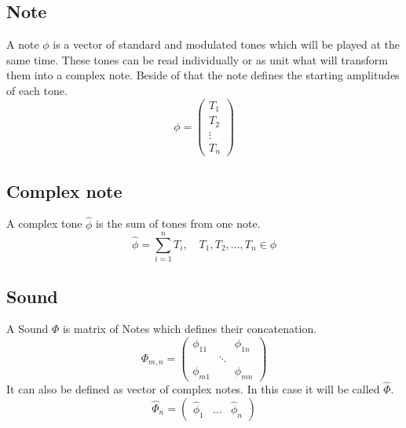 \subsection{Note}
	A note $ \phi $	is a vector of standard and modulated tones which will be played at the same time. These tones can be read individually or as unit what will transform them into a complex note. Beside of that the note defines the starting amplitudes of each tone.
	\begin{equation}\label{NoteRef}
		\phi=
		\begin{pmatrix}
			T_1\\
			T_2\\
			\vdots\\
			T_n
		\end{pmatrix}
	\end{equation}
	
\subsection{Complex note}
	A complex tone $ \widehat{\phi} $ is the sum of tones from one note.
	\begin{equation}\label{CompNoteRef}
	\widehat{\phi}=\sum_{i=1}^{n}T_i, \quad T_1, T_2, \dots, T_n\in\phi
	\end{equation}
	
\subsection{Sound}
	A Sound $ \Phi $ is matrix of Notes which defines their concatenation. 
	\begin{equation}\label{SoundRef}
		\Phi_{m,n}= 
		\begin{pmatrix}
			\phi_{11}&&\phi_{1n}\\
			&\ddots&\\
			\phi_{m1}&&\phi_{mn}

		\end{pmatrix}
	\end{equation}
	It can also be defined as vector of complex notes. In this case it will be called $ \widehat{\Phi} $.
	\begin{equation}\label{CompSoundRef}
		\widehat{\Phi}_n=
		\begin{pmatrix}
			\widehat{\phi}_1&\dots&\widehat{\phi}_n
		\end{pmatrix}
	\end{equation}